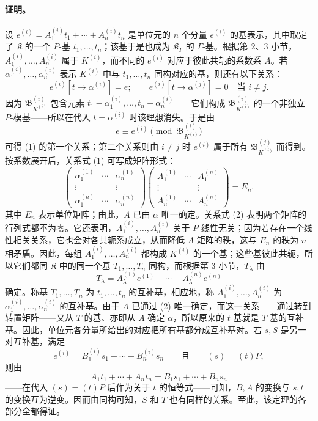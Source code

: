 \paragraph{证明。}
设 $e^{(i)}=A_1^{(i)}t_1+\cdots+A_n^{(i)}t_n$ 是单位元的 $n$ 个分量 $e^{(i)}$ 的基表示，其中取定了 $\mathfrak K$ 的一个 $P$-基 $t_1,\ldots,t_n$；该基于是也成为 $\mathfrak K_\Gamma$ 的 $\Gamma$-基。根据第 2、3 小节，$A_1^{(i)},\ldots,A_n^{(i)}$ 属于 $K^{(i)}$，而不同的 $e^{(i)}$ 对应于彼此共轭的系数系 $A$。若 $\alpha_1^{(i)},\ldots,\alpha_n^{(i)}$ 表示 $K^{(i)}$ 中与 $t_1,\ldots,t_n$ 同构对应的基，则还有以下关系：
\begin{equation}
e^{(i)}[t\to\alpha^{(i)}]=e;
\qquad e^{(i)}[t\to\alpha^{(j)}]=0\quad\text{当 }i\ne j. \tag{1}
\end{equation}
因为 $\mathfrak B_{K^{(i)}}^{(i)}$ 包含元素 $t_1-\alpha_1^{(i)},\ldots,t_n-\alpha_n^{(i)}$——它们构成 $\mathfrak B_{K^{(i)}}^{(i)}$ 的一个非独立 $P$-模基——所以在代入 $t=\alpha^{(i)}$ 时该理想消失。于是由
\[
e\equiv e^{(i)}\pmod{\mathfrak B_{K^{(i)}}^{(i)}}
\]
可得 (1) 的第一个关系；第二个关系则由 $i\ne j$ 时 $e^{(i)}$ 属于所有 $\mathfrak B_{K^{(j)}}^{(j)}$ 而得到。按系数展开后，关系式 (1) 可写成矩阵形式：
\begin{equation}
\begin{pmatrix}
\alpha_1^{(1)}&\cdots&\alpha_n^{(1)}\\
\vdots&&\vdots\\
\alpha_1^{(n)}&\cdots&\alpha_n^{(n)}
\end{pmatrix}
\begin{pmatrix}
A_1^{(1)}&\cdots&A_1^{(n)}\\
\vdots&&\vdots\\
A_n^{(1)}&\cdots&A_n^{(n)}
\end{pmatrix}=E_n. \tag{2}
\end{equation}
其中 $E_n$ 表示单位矩阵；由此，$A$ 已由 $\alpha$ 唯一确定。关系式 (2) 表明两个矩阵的行列式都不为零。它还表明，$A_1^{(i)},\ldots,A_n^{(i)}$ 关于 $P$ 线性无关；因为若存在一个线性相关关系，它也会对各共轭系成立，从而降低 $A$ 矩阵的秩，这与 $E_n$ 的秩为 $n$ 相矛盾。因此，每组 $A_1^{(i)},\ldots,A_n^{(i)}$ 都构成 $K^{(i)}$ 的一个基；这些基彼此共轭，所以它们都同 $\mathfrak K$ 中的同一个基 $T_1,\ldots,T_n$ 同构，而根据第 3 小节，$T_\lambda$ 由
\[
T_\lambda=A_\lambda^{(1)}e^{(1)}+\cdots+A_\lambda^{(n)}e^{(n)}
\]
确定。称基 $T_1,\ldots,T_n$ 为 $t_1,\ldots,t_n$ 的互补基，相应地，称 $A_1^{(i)},\ldots,A_n^{(i)}$ 为 $\alpha_1^{(i)},\ldots,\alpha_n^{(i)}$ 的互补基。由于 $A$ 已通过 (2) 唯一确定，而这一关系——通过转到转置矩阵——又从 $T$ 的基、亦即从 $A$ 确定 $\alpha$，所以原来的 $t$ 基就是 $T$ 基的互补基。因此，单位元各分量所给出的对应把所有基都分成互补基对。若 $s,S$ 是另一对互补基，满足
\[
e^{(i)}=B_1^{(i)}s_1+\cdots+B_n^{(i)}s_n
\qquad\text{且}\qquad (s)=(t)P,
\]
则由
\[
A_1t_1+\cdots+A_nt_n=B_1s_1+\cdots+B_ns_n
\]
——在代入 $(s)=(t)P$ 后作为关于 $t$ 的恒等式——可知，$B,A$ 的变换与 $s,t$ 的变换互为逆变。因而由同构可知，$S$ 和 $T$ 也有同样的关系。至此，该定理的各部分全都得证。

